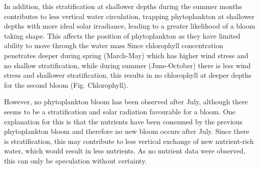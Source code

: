 \documentclass[../Main.tex]{subfiles}
\begin{document}
In addition, this stratification at shallower depths during the summer months contributes to less vertical water circulation, trapping phytoplankton at shallower depths with more ideal solar irradiance, leading to a greater likelihood of a bloom taking shape. This affects the position of phytoplankton as they have limited ability to move through the water mass%
Since chlorophyll concentration penetrates deeper during spring (March-May) which has higher wind stress and no shallow stratification, while during summer (June-October) there is less wind stress and shallower stratification, this results in no chlorophyll at deeper depths for the second bloom (Fig. Chlorophyll).

However, no phytoplankton bloom has been observed after July, although there seems to be a stratification and solar radiation favourable for a bloom. One explanation for this is that the nutrients have been consumed by the previous phytoplankton bloom and therefore no new bloom occurs after July. Since there is stratification, this may contribute to less vertical exchange of new nutrient-rich water, which would result in less nutrients. As no nutrient data were observed, this can only be speculation without certainty. 






 
\end{document}
